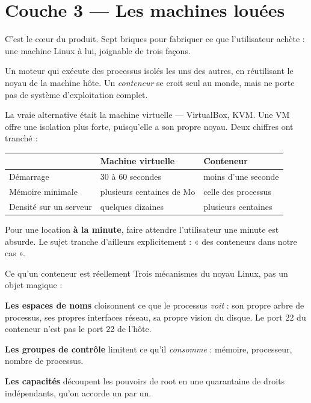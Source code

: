 \chapter{Couche 3 — Les machines louées}

C'est le cœur du produit. Sept briques pour fabriquer ce que l'utilisateur
achète : une machine Linux à lui, joignable de trois façons.


\quoi
Un moteur qui exécute des processus isolés les uns des autres, en réutilisant le
noyau de la machine hôte. Un \emph{conteneur} se croit seul au monde, mais ne
porte pas de système d'exploitation complet.

\pourquoi
La vraie alternative était la machine virtuelle --- VirtualBox, KVM. Une VM
offre une isolation plus forte, puisqu'elle a son propre noyau. Deux chiffres
ont tranché :

\begin{center}
\small
\begin{tabularx}{0.9\textwidth}{@{}lXX@{}}
\toprule
& \textbf{Machine virtuelle} & \textbf{Conteneur} \\
\midrule
Démarrage & 30 à 60 secondes & moins d'une seconde \\
Mémoire minimale & plusieurs centaines de Mo & celle des processus \\
Densité sur un serveur & quelques dizaines & plusieurs centaines \\
\bottomrule
\end{tabularx}
\end{center}

Pour une location \textbf{à la minute}, faire attendre l'utilisateur une minute
est absurde. Le sujet tranche d'ailleurs explicitement : « des conteneurs dans
notre cas ».

\begin{notion}{Ce qu'un conteneur est réellement}
Trois mécanismes du noyau Linux, pas un objet magique :

\textbf{Les espaces de noms} cloisonnent ce que le processus \emph{voit} : son
propre arbre de processus, ses propres interfaces réseau, sa propre vision du
disque. Le port 22 du conteneur n'est pas le port 22 de l'hôte.

\textbf{Les groupes de contrôle} limitent ce qu'il \emph{consomme} : mémoire,
processeur, nombre de processus.

\textbf{Les capacités} découpent les pouvoirs de root en une quarantaine de
droits indépendants, qu'on accorde un par un.
\end{notion}

